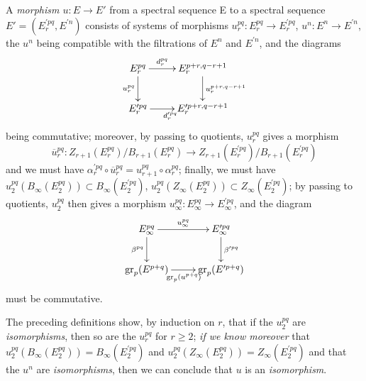 \begin{env}[11.1.2]
\label{0.11.1.2}
A \emph{morphism $u:E\to E'$} from a spectral sequence E to a spectral
sequence $E'=(E_r^{\prime pq},E^{\prime n})$ consists of systems of
morphisms $u_r^{pq}:E_r^{pq}\to E_r^{\prime pq}$,
$u^n:E^n\to E^{\prime n}$, the $u^n$ being compatible with the filtrations
of $E^n$ and $E^{\prime n}$, and the diagrams
\[
  \xymatrix{
    E_r^{pq}\ar[r]^-{d_r^{pq}}\ar[d]_{u_r^{pq}} &
    E_r^{p+r,q-r+1}\ar[d]^{u_r^{p+r,q-r+1}}\\
    E_r^{\prime pq}\ar[r]_{d_r^{\prime pq}} &
    E_r^{\prime p+r,q-r+1}
  }
\]
being commutative; moreover, by passing to quotients, $u_r^{pq}$ gives a
morphism
\[
  \overline u_r^{pq}:
  Z_{r+1}(E_r^{pq})/B_{r+1}(E_r^{pq})\longrightarrow
  Z_{r+1}(E_r^{\prime pq})/B_{r+1}(E_r^{\prime pq})
\]
and we must have
$\alpha_r^{\prime pq}\circ\overline u_r^{pq}
=u_{r+1}^{pq}\circ\alpha_r^{pq}$; finally, we must have
$u_2^{pq}(B_\infty(E_2^{pq}))\subset B_\infty(E_2^{\prime pq})$,
$u_2^{pq}(Z_\infty(E_2^{pq}))\subset Z_\infty(E_2^{\prime pq})$; by
passing to quotients, $u_2^{pq}$ then gives a morphism
$u_\infty^{pq}:E_\infty^{pq}\to E_\infty^{\prime pq}$, and the diagram
\[
  \xymatrix{
    E_\infty^{pq}\ar[r]^-{u_\infty^{pq}}\ar[d]_{\beta^{pq}} &
    E_\infty^{\prime pq}\ar[d]^{\beta^{\prime pq}}\\
    \operatorname{gr}_p(E^{p+q})
      \ar[r]_{\operatorname{gr}_p(u^{p+q})} &
    \operatorname{gr}_p(E^{\prime p+q})
  }
\]
must be commutative.

The preceding definitions show, by induction on $r$, that if the
$u_2^{pq}$ are \emph{isomorphisms}, then so are the $u_r^{pq}$
for $r\geq2$; \emph{if we know moreover} that
$u_2^{pq}(B_\infty(E_2^{pq}))=B_\infty(E_2^{\prime pq})$ and
$u_2^{pq}(Z_\infty(E_2^{pq}))=Z_\infty(E_2^{\prime pq})$ and that the
$u^n$ are \emph{isomorphisms}, then we can conclude that $u$ is an
\emph{isomorphism}.
\end{env}

